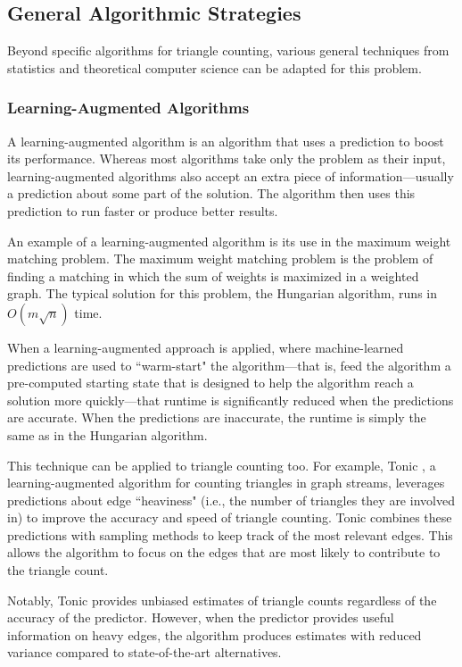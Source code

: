 \documentclass[11pt, margin=1in]{article}
\begin{document}
\subsection{General Algorithmic Strategies}

Beyond specific algorithms for triangle counting, various general techniques from statistics and theoretical computer science can be adapted for this problem.

\subsubsection{Learning-Augmented Algorithms}

A learning-augmented algorithm \cite{roughgarden_algorithms_2020} is an algorithm that uses a prediction to boost its performance.
Whereas most algorithms take only the problem as their input, learning-augmented algorithms also accept an extra piece of information—usually a prediction about some part of the solution.
The algorithm then uses this prediction to run faster or produce better results.

An example of a learning-augmented algorithm is its use in the maximum weight matching problem.
The maximum weight matching problem \cite{duan_linear-time_2014} is the problem of finding a matching in which the sum of weights is maximized in a weighted graph.
The typical solution for this problem, the Hungarian algorithm, runs in $O(m\sqrt{n})$ time.

When a learning-augmented approach \cite{dinitz_faster_2021} is applied, where machine-learned predictions are used to ``warm-start" the algorithm—that is, feed the algorithm a pre-computed starting state that is designed to help the algorithm reach a solution more quickly—that runtime is significantly reduced when the predictions are accurate.
When the predictions are inaccurate, the runtime is simply the same as in the Hungarian algorithm.

This technique can be applied to triangle counting too.
For example, Tonic \cite{boldrin_fast_2024}, a learning-augmented algorithm for counting triangles in graph streams, leverages predictions about edge ``heaviness" (i.e., the number of triangles they are involved in) to improve the accuracy and speed of triangle counting.
Tonic combines these predictions with sampling methods to keep track of the most relevant edges.
This allows the algorithm to focus on the edges that are most likely to contribute to the triangle count.

Notably, Tonic provides unbiased estimates of triangle counts regardless of the accuracy of the predictor.
However, when the predictor provides useful information on heavy edges, the algorithm produces estimates with reduced variance compared to state-of-the-art alternatives.
\end{document}
